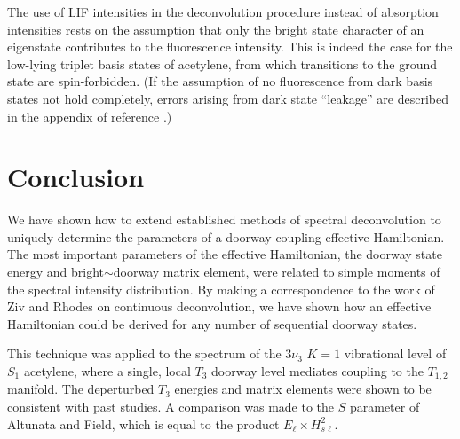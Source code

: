 \documentclass[12pt]{mitthesis}
\begin{document}
The use of LIF intensities in the deconvolution procedure instead of
absorption intensities rests on the assumption that only the bright
state character of an eigenstate contributes to the fluorescence
intensity.  This is indeed the case for the low-lying triplet basis
states of acetylene, from which transitions to the ground state are
spin-forbidden.  (If the assumption of no fluorescence from dark basis
states not hold completely, errors arising from dark state ``leakage''
are described in the appendix of reference \cite{delon95}.)

\section{Conclusion}

We have shown how to extend established methods of spectral
deconvolution to uniquely determine the parameters of a
doorway-coupling effective Hamiltonian.  The most important parameters
of the effective Hamiltonian, the doorway state energy and
bright$\sim$doorway matrix element, were related to simple moments of
the spectral intensity distribution.  By making a correspondence to
the work of Ziv and Rhodes on continuous deconvolution, we have shown
how an effective Hamiltonian could be derived for any number of
sequential doorway states.

This technique was applied to the spectrum of the $3\nu_3$ $K=1$
vibrational level of $S_1$ acetylene, where a single, local $T_3$
doorway level mediates coupling to the $T_{1,2}$ manifold.  The
deperturbed $T_3$ energies and matrix elements were shown to be
consistent with past studies.  A comparison was made to the $S$
parameter of Altunata and Field, which is equal to the product
$E_{\ell} \times H_{s\ell}^2$.





\end{document}
